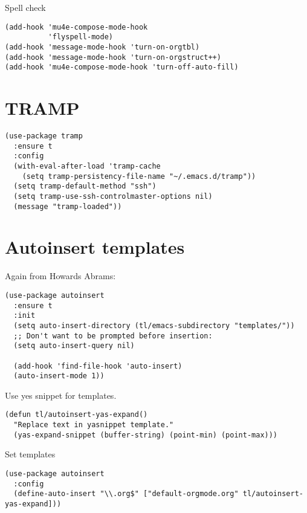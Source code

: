 \documentclass[12pt]{article}
\begin{document}
Spell check 

\begin{verbatim}
(add-hook 'mu4e-compose-mode-hook
          'flyspell-mode)
(add-hook 'message-mode-hook 'turn-on-orgtbl)
(add-hook 'message-mode-hook 'turn-on-orgstruct++)
(add-hook 'mu4e-compose-mode-hook 'turn-off-auto-fill)
\end{verbatim}

\section{TRAMP}
\label{sec:org4f680d2}

\begin{verbatim}
(use-package tramp
  :ensure t
  :config
  (with-eval-after-load 'tramp-cache
    (setq tramp-persistency-file-name "~/.emacs.d/tramp"))
  (setq tramp-default-method "ssh")
  (setq tramp-use-ssh-controlmaster-options nil) 
  (message "tramp-loaded"))
\end{verbatim}

\section{Autoinsert templates}
\label{sec:orgde82a0c}

Again from Howards Abrams: 
\begin{verbatim}
(use-package autoinsert
  :ensure t
  :init
  (setq auto-insert-directory (tl/emacs-subdirectory "templates/"))
  ;; Don't want to be prompted before insertion:
  (setq auto-insert-query nil)

  (add-hook 'find-file-hook 'auto-insert)
  (auto-insert-mode 1))

\end{verbatim}

Use yes snippet for templates. 

\begin{verbatim}
(defun tl/autoinsert-yas-expand()
  "Replace text in yasnippet template."
  (yas-expand-snippet (buffer-string) (point-min) (point-max)))
\end{verbatim}

Set templates

\begin{verbatim}
(use-package autoinsert 
  :config
  (define-auto-insert "\\.org$" ["default-orgmode.org" tl/autoinsert-yas-expand]))
\end{verbatim}
\end{document}
